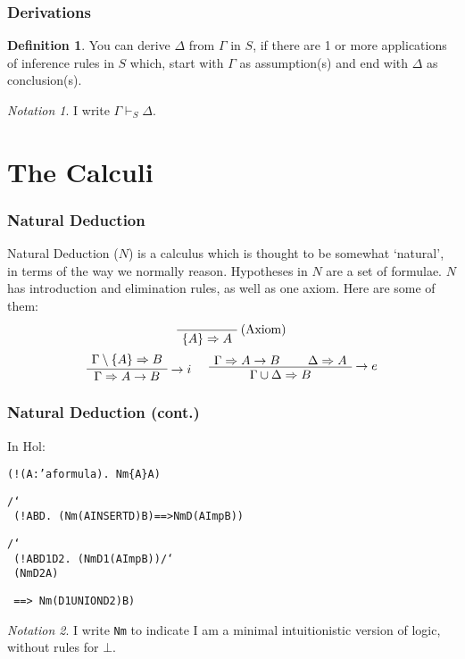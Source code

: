 \documentclass[english,svgnames,hide notes,12pt]{beamer}
\theoremstyle{definition}
\newtheorem{defn}{Definition}
\theoremstyle{remark}
\newtheorem{notn}{Notation}
\begin{document}
\begin{frame}
    \frametitle{Derivations}
    \begin{defn}
         You can derive $\Delta$ from $\Gamma$ in $S$, 
         if there are 1 or more applications of inference rules in $S$ which, 
         start with $\Gamma$ as assumption(s) and end with $\Delta$ as conclusion(s).
    \end{defn}
    \begin{notn}
        I write $\Gamma \vdash_S \Delta$. 
    \end{notn}
\end{frame}

\section{The Calculi}

\begin{frame}
    \frametitle{Natural Deduction}
    Natural Deduction ($N$) is a calculus which is thought to be somewhat `natural', in terms of the way we normally reason. Hypotheses in $N$ are a set of formulae. $N$ has introduction and elimination rules, as well as one axiom. Here are some of them:

    \[
        \AxiomC{}
        \RightLabel{(Axiom)}
        \UnaryInfC{$\{A\} \Rightarrow A$}
        \DisplayProof 
    \]
    \[
        \AxiomC{$\Gamma\setminus\{A\} \Rightarrow B$}
        \RightLabel{$\to i$}
        \UnaryInfC{$\Gamma\Rightarrow A\to B$}
        \DisplayProof
        \hspace{0.5cm}
        \AxiomC{$\Gamma\Rightarrow A\to B$}
        \AxiomC{$\Delta\Rightarrow A$}
        \RightLabel{$\to e$}
        \BinaryInfC{$\Gamma\cup\Delta\Rightarrow B$}
        \DisplayProof
    \]
\end{frame}
\begin{frame}
    \frametitle{Natural Deduction (cont.)}
    In Hol:
    \begin{alltt}
        (! (A :'a formula).\ Nm \{A\} A)

        /\char`\\\ (!A B D.\ (Nm (A INSERT D) B) ==> Nm D (A Imp B))

        /\char`\\\ (!A B D1 D2.\ (Nm D1 (A Imp B)) /\char`\\\ (Nm D2 A)

        ~ ==>\ Nm (D1 UNION D2) B)
    \end{alltt}
    \begin{notn}
        I write \texttt{Nm} to indicate I am a minimal intuitionistic version of logic, without rules for $\bot$.
    \end{notn}
\end{frame}
\end{document}
